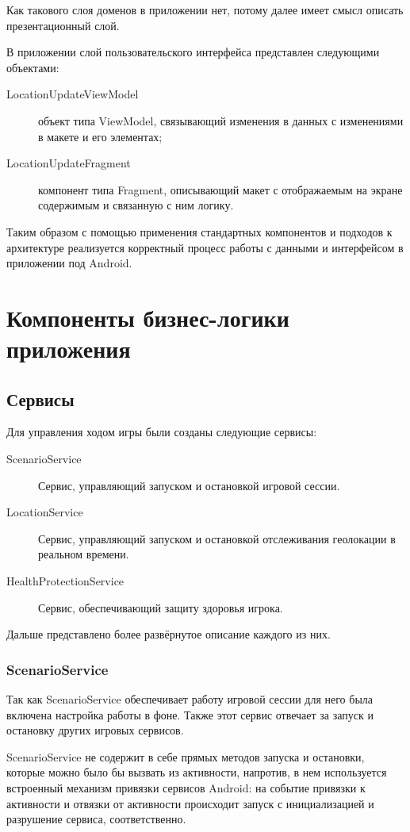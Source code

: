 Как такового слоя доменов в приложении нет, потому далее имеет смысл описать презентационный слой.

В приложении слой пользовательского интерфейса представлен следующими объектами:
\begin{description}
	\item[LocationUpdateViewModel] объект типа ViewModel, связывающий изменения в данных с изменениями в макете и его элементах;
	\item[LocationUpdateFragment] компонент типа Fragment, описывающий макет с отображаемым на экране содержимым и связанную с ним логику.
\end{description}

Таким образом с помощью применения стандартных компонентов и подходов к архитектуре реализуется корректный процесс работы с данными и интерфейсом в приложении под Android. 


\section{Компоненты бизнес-логики приложения}
\subsection{Сервисы}
Для управления ходом игры были созданы следующие сервисы:
\begin{description}
	\item[ScenarioService] Сервис, управляющий запуском и остановкой игровой сессии.
	\item[LocationService] Сервис, управляющий запуском и остановкой отслеживания геолокации в реальном времени.
	\item[HealthProtectionService] Сервис, обеспечивающий защиту здоровья игрока.
\end{description}
\smallskip
Дальше представлено более развёрнутое описание каждого из них.

\subsubsection*{ScenarioService}
Так как ScenarioService обеспечивает работу игровой сессии для него была включена настройка работы в фоне. Также этот сервис отвечает за запуск и остановку других игровых сервисов. 

ScenarioService не содержит в себе прямых методов запуска и остановки, которые можно было бы вызвать из активности, напротив, в нем используется встроенный механизм привязки сервисов Android: на событие привязки к активности и отвязки от активности происходит запуск с инициализацией и разрушение сервиса, соответственно.

